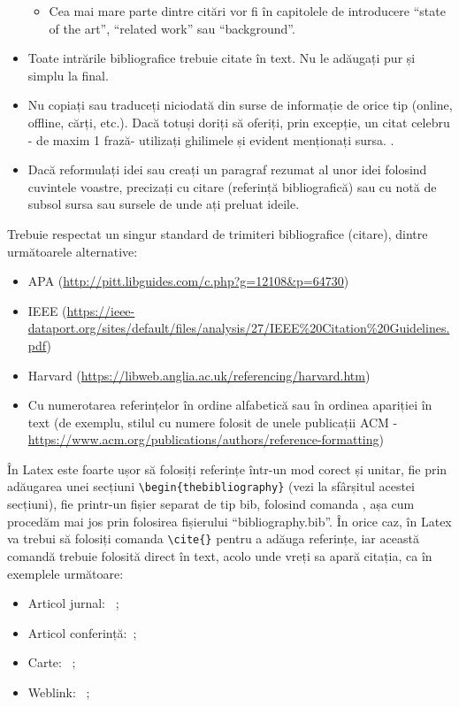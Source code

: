 \documentclass[12pt,a4paper]{report}
\begin{document}
\begin{itemize}
\begin{itemize}
		\item	Cea mai mare parte dintre citări vor fi în capitolele de introducere ``state of the art'', ``related work'' sau ``background''.
	\end{itemize}
	\item 	Toate intrările bibliografice trebuie citate în text. Nu le adăugați pur și simplu la final.
	\item 	Nu copiați sau traduceți niciodată din surse de informație de orice tip (online, offline, cărți, etc.). Dacă totuși doriți să oferiți, prin excepție, un citat celebru - de maxim 1 frază- utilizați ghilimele și evident menționați sursa. .
	\item 	Dacă reformulați idei sau creați un paragraf rezumat al unor idei folosind cuvintele voastre, precizați cu citare (referință bibliografică) sau cu notă de subsol sursa sau sursele de unde ați preluat ideile.
\end{itemize}

Trebuie respectat un singur standard de trimiteri bibliografice (citare), dintre următoarele alternative:
\begin{itemize}
	\item APA (\url{http://pitt.libguides.com/c.php?g=12108\&p=64730})
	\item IEEE (\url{https://ieee-dataport.org/sites/default/files/analysis/27/IEEE\%20Citation\%20Guidelines.pdf}) 
	\item Harvard (\url{https://libweb.anglia.ac.uk/referencing/harvard.htm})
	\item Cu numerotarea referințelor în ordine alfabetică sau în ordinea apariției în text (de exemplu, stilul cu numere folosit de unele publicații ACM - \url{https://www.acm.org/publications/authors/reference-formatting}) 
\end{itemize}

În Latex este foarte ușor să folosiți referințe într-un mod corect și unitar, fie prin adăugarea unei secțiuni
\verb!\begin{thebibliography}!
(vezi la sfârșitul acestei secțiuni), fie printr-un fișier separat de tip bib, folosind comanda
\verb!!,
așa cum procedăm mai jos prin folosirea fișierului ``bibliography.bib''. În orice caz, în Latex va trebui să folosiți comanda
\verb!\cite{}!
pentru a adăuga referințe, iar această comandă trebuie folosită direct în text, acolo unde vreți sa apară citația, ca în exemplele următoare:
\begin{itemize}
	\item Articol jurnal: ~\cite{article};
	\item Articol conferință:~\cite{proc};
	\item Carte: ~\cite{book};
	\item Weblink: ~\cite{silva};
\end{itemize}
\end{document}
